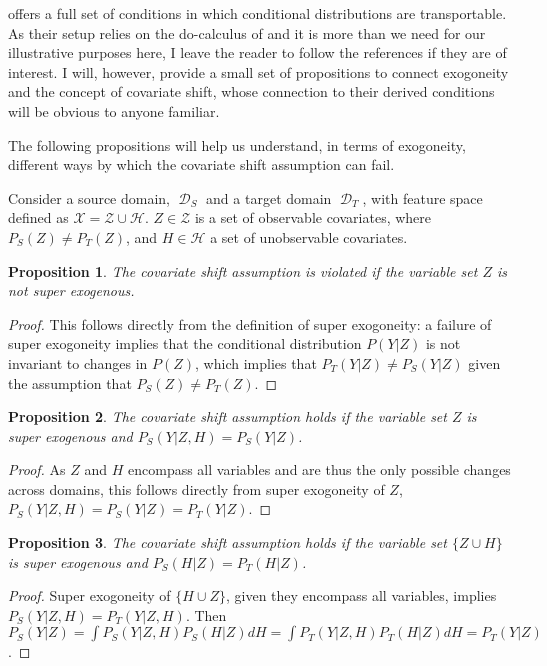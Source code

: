 \documentclass[a4paper,12pt]{article}
\newtheorem{prop}{Proposition}
\DeclareMathOperator*{\D}{\mathcal{D}}
\begin{document}
\cite{Pearl2014} offers a full set of conditions in which conditional distributions are transportable. As their setup relies on the do-calculus of \cite{Pearl2000} and it is more than we need for our illustrative purposes here, I leave the reader to follow the references if they are of interest. I will, however, provide a small set of propositions to connect exogoneity and the concept of covariate shift, whose connection to their derived conditions will be obvious to anyone familiar. 

The following propositions will help us understand, in terms of exogoneity, different ways by which the covariate shift assumption can fail. 

Consider a source domain, $\D_S$ and a target domain $\D_T$, with feature space defined as $\mathcal{X} = \mathcal{Z} \cup \mathcal{H}$. $Z \in \mathcal{Z}$ is a set of observable covariates, where $P_S(Z) \neq P_T(Z)$, and $H \in \mathcal{H}$ a set of unobservable covariates. 

\begin{prop}
  The covariate shift assumption is violated if the variable set $Z$ is not super exogenous.
\end{prop}

\begin{proof}
  This follows directly from the definition of super exogoneity: a failure of super exogoneity implies that the conditional distribution $P(Y|Z)$ is not invariant to changes in $P(Z)$, which implies that $P_T(Y|Z) \neq P_S(Y|Z)$ given the assumption that $P_S(Z) \neq P_T(Z)$.
\end{proof}

\begin{prop}
  The covariate shift assumption holds if the variable set $Z$ is super exogenous and $P_S(Y|Z, H) = P_S(Y | Z)$.
\end{prop}

\begin{proof}
As $Z$ and $H$ encompass all variables and are thus the only possible changes across domains, this follows directly from super exogoneity of $Z$, $P_S(Y|Z, H) = P_S(Y | Z) = P_T(Y | Z)$.
\end{proof}

\begin{prop}
  The covariate shift assumption holds if the variable set $\{ Z \cup H \}$ is super exogenous and $P_S(H|Z) = P_T(H|Z)$.
\end{prop}

\begin{proof}
  Super exogoneity of $\{H \cup Z \}$, given they encompass all variables, implies $P_S(Y|Z,H) = P_T(Y|Z,H)$. Then $P_S(Y|Z) = \int P_S(Y|Z,H)P_S(H|Z) dH = \int P_T(Y|Z,H)P_T(H|Z) dH = P_T(Y|Z)$.
\end{proof}
\end{document}

